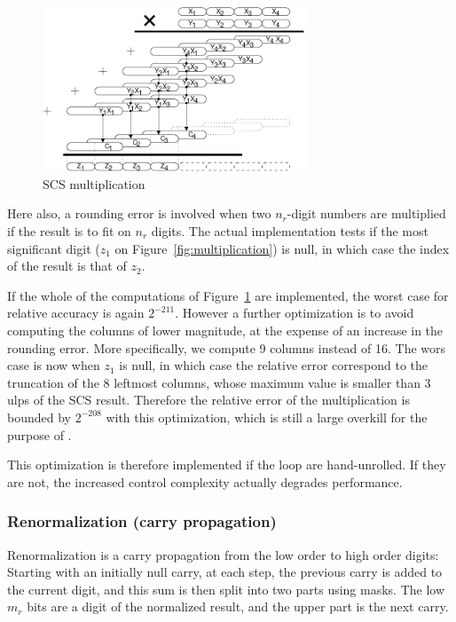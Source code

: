 \begin{figure}[h]
\begin{center}
\includegraphics[width=0.7\textwidth]{fig_scs/multiplication}
\caption{SCS multiplication \label{fig:scsmultiplication}}
\end{center}
\end{figure}

Here also, a rounding error is involved when two $n_r$-digit numbers
are multiplied if the result is to fit on $n_r$ digits. The actual
implementation tests if the most significant digit ($z_1$ on
Figure~\ref{fig:multiplication}) is null, in which case the index of
the result is that of $z_2$.

If the whole of the computations of
Figure~\ref{fig:scsmultiplication} are implemented, the worst case
for relative accuracy is again $2^{-211}$. However a further
optimization is to avoid computing the columns of lower magnitude, at
the expense of an increase in the rounding error. More specifically,
we compute 9 columns instead of 16.  The wors case is now when $z_1$
is null, in which case the relative error correspond to the truncation
of the 8 leftmost columns, whose maximum value is smaller than 3 ulps
of the SCS result. Therefore the relative error of the multiplication
is bounded by $2^{-208}$ with this optimization, which is still a
large overkill for the purpose of \crlibm.

This optimization is therefore implemented if the loop are hand-unrolled.
If they are not, the increased control complexity actually degrades
performance.


\subsubsection{Renormalization (carry propagation) \label{renorm}}

Renormalization is a carry propagation from the low order to high
order digits: Starting with an initially null carry, at each step, the
previous carry is added to the current digit, and this sum is then
split into two parts using masks. The low $m_r$ bits are a digit of
the normalized result, and the upper part is the next carry.

